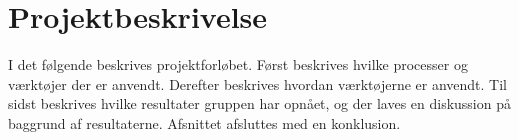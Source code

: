 \chapter{Projektbeskrivelse}
I det følgende beskrives projektforløbet. Først beskrives hvilke processer og værktøjer der er anvendt. Derefter beskrives hvordan værktøjerne er anvendt. Til sidst beskrives hvilke resultater gruppen har opnået, og der laves en diskussion på baggrund af resultaterne. Afsnittet afsluttes med en konklusion.



\newpage


\newpage


\newpage


\newpage


\newpage
%

\newpage


\newpage

